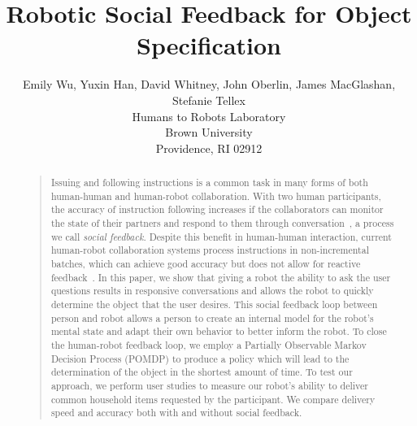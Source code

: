 \documentclass[letterpaper]{article}
\begin{document}
%
\title{Robotic Social Feedback for Object Specification}
\author{Emily Wu, Yuxin Han, David Whitney, John Oberlin, James MacGlashan, Stefanie Tellex\\
Humans to Robots Laboratory \\
Brown University\\
Providence, RI 02912\\
}
\maketitle

\begin{abstract}
\begin{quote}

	Issuing and following instructions is a common task in many forms of both human-human and human-robot collaboration. 
	With two human participants, the accuracy of instruction following increases 
if the collaborators can monitor the state of their partners and respond to
them through conversation~\cite{clark04}, a process we call \emph{social
feedback}. 
Despite this benefit in human-human interaction, current human-robot collaboration
systems process instructions in non-incremental batches, which can achieve good
accuracy but does not allow for reactive feedback~\cite{tellex11,matuszek12,tellex12,misra14}. 
In this paper, we show that giving a robot the ability to ask the user
questions results in responsive conversations and allows the robot to
quickly determine the object that the user desires.
This social feedback loop between person and robot allows a person to create an
internal model for the robot's mental state and adapt their own behavior to better
inform the robot.  
To close the human-robot feedback loop, we employ a Partially
Observable Markov Decision Process (POMDP) to produce a policy which will lead to the determination of the object in the shortest amount of time.  
To test our approach, we perform user studies to measure our robot's ability to deliver 
common household items requested by the participant.  We compare
 delivery speed and accuracy both with and without social feedback.

\end{quote}
\end{abstract}
\end{document}

